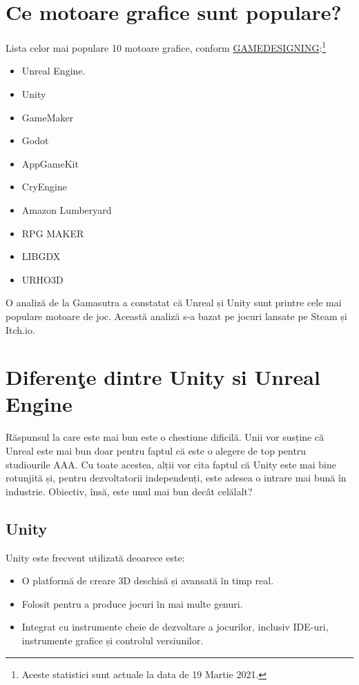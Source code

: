 \documentclass[12pt]{article}
\begin{document}
\section{Ce motoare grafice sunt populare?}
\hspace{5pt} Lista celor mai populare 10 motoare grafice, conform \href{https://www.gamedesigning.org/career/video-game-engines/}{GAMEDESIGNING}:\footnote[1]{Aceste statistici sunt actuale la data de 19 Martie 2021.} 
\begin{itemize}
  \item Unreal Engine.
  \item Unity
  \item GameMaker
  \item Godot
  \item AppGameKit
  \item CryEngine
  \item Amazon Lumberyard
  \item RPG MAKER
  \item LIBGDX
  \item URHO3D
\end{itemize}


O analiză de la Gamasutra a constatat că Unreal și Unity sunt printre cele mai populare motoare de joc. Această analiză s-a bazat pe jocuri lansate pe Steam și Itch.io.

\newpage
\section{Diferen\c{t}e dintre Unity si Unreal Engine}
Răspunsul la care este mai bun este o chestiune dificilă. Unii vor susține că Unreal este mai bun doar pentru faptul că este o alegere de top pentru studiourile AAA. Cu toate acestea, alții vor cita faptul că Unity este mai bine rotunjită și, pentru dezvoltatorii independenți, este adesea o intrare mai bună în industrie. Obiectiv, însă, este unul mai bun decât celălalt?

\subsection{Unity}
Unity este frecvent utilizată deoarece este:
\begin{itemize}
\item O platformă de creare 3D deschisă și avansată în timp real.
\item Folosit pentru a produce jocuri în mai multe genuri.
\item Integrat cu instrumente cheie de dezvoltare a jocurilor, inclusiv IDE-uri, instrumente grafice și controlul versiunilor.
\end{itemize}
\end{document}
